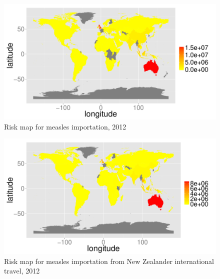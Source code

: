 \documentclass{article}
\begin{document}
\begin{itemize}
\begin{figure}
\begin{center}
\includegraphics{draftfinalreport-042}
\end{center}
\caption{Risk map for measles importation, 2012 }
\label{fig:risk12}
\end{figure}

\begin{figure}
\begin{center}
\includegraphics{draftfinalreport-043}
\end{center}
\caption{Risk map for measles importation from New Zealander international travel, 2012 }
\label{fig:nzrisk12}
\end{figure}


\end{itemize}
\end{document}
